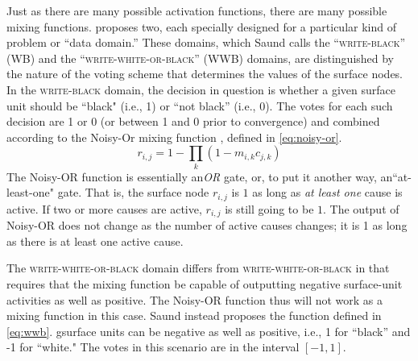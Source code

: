 Just as there are many possible activation functions, there are many possible mixing functions.
\citet{saund:94} proposes two, each specially designed for a particular kind of problem or ``data domain.'' These
domains, which Saund calls the ``\textsc{write-black}'' (WB) and the ``\textsc{write-white-or-black}'' (WWB) domains, are distinguished by the nature of the voting scheme that determines the values of the surface
nodes. In the \textsc{write-black} domain, the decision in question is whether a given surface unit should be ``black" (i.e., 1) or ``not black'' (i.e., 0). The votes for each such decision are 1 or 0 (or between 1 and 0 prior to convergence) and combined according to the  Noisy-Or mixing function \citep{pearl:1988}, defined in \eqref{eq:noisy-or}.
\begin{equation}\label{eq:noisy-or}
r_{i,j} = 1 - \prod\limits_{k} (1 - m_{i,k} c_{j,k})
\end{equation}
 The Noisy-OR function is essentially an\textit{OR} gate, or, to put it another way, 
 an``at-least-one" gate. That is, the surface node $r_{i,j}$ is $1$ as long as 
 \emph{at least one} cause is active.
 If two or more causes are active,
$r_{i,j}$ is still going to be $1$. The output of Noisy-OR does not change 
as the number of active causes changes; it is 1 as long as there is at least one active cause.

The \textsc{write-white-or-black} domain differs from \textsc{write-white-or-black} in that requires that the mixing function be capable of outputting negative surface-unit activities as well as positive. The Noisy-OR function thus will not work as a mixing function in this case. Saund instead proposes the function defined in \eqref{eq:wwb}. gsurface units can be negative as well as positive, i.e., 1 for ``black'' and -1 for ``white."  The votes in this scenario are in the interval $[-1,1]$.


